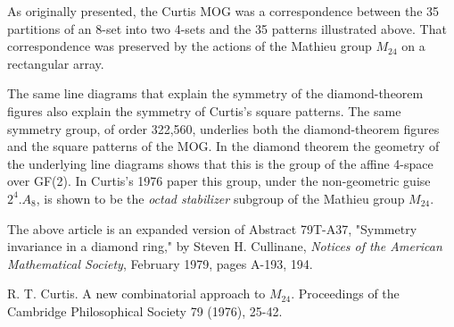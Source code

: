 \documentclass[12pt]{article}
\begin{document}
As originally presented, the Curtis MOG was a correspondence between the 35 partitions of an 8-set into two 4-sets and the 35 patterns illustrated above. That correspondence was preserved by the actions of the Mathieu group $M_{24}$ on a rectangular array.

The same line diagrams that explain the symmetry of the diamond-theorem figures also explain the symmetry of Curtis's square patterns. The same symmetry group, of order 322,560, underlies both the diamond-theorem figures and the square patterns of the MOG. In the diamond theorem the geometry of the underlying line diagrams shows that this is the group of the affine 4-space over GF(2). In Curtis's 1976 paper this group, under the non-geometric guise $2^{4}.A_{8}$, is shown to be the \emph{octad stabilizer} subgroup of the Mathieu group $M_{24}$.

The above article is an expanded version of Abstract 79T-A37, "Symmetry invariance in a diamond ring," by Steven H. Cullinane, \emph{Notices of the American Mathematical Society}, February 1979, pages A-193, 194.

\begin{thebibliography}
 R. T. Curtis.  A new combinatorial approach to $M_{24}$. Proceedings of the Cambridge Philosophical Society 79 (1976), 25-42.
\end{thebibliography}
\end{document}
